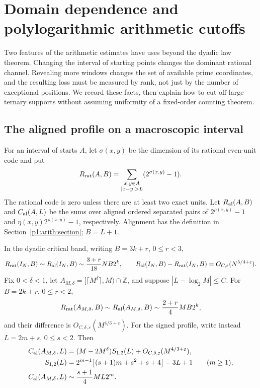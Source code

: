 \section{Domain dependence and polylogarithmic arithmetic cutoffs}
\label{p1:consequences:section}

Two features of the arithmetic estimates have uses beyond the dyadic
law theorem. Changing the interval of starting points changes the dominant
rational channel. Revealing more windows changes the set of available
prime coordinates, and the resulting loss must be measured by rank,
not just by the number of exceptional positions. We record these facts,
then explain how to cut off large ternary supports without assuming
uniformity of a fixed-order counting theorem.

\subsection{The aligned profile on a macroscopic interval}

For an interval of starts $A$, let $\sigma(x,y)$ be the dimension
of its rational even-unit code and put
\[
 R_{\rm rat}(A,B)=\sum_{\substack{x,y\in A\\|x-y|>L}}
             (2^{\sigma(x,y)}-1).
\]
The rational code is zero unless there are at least two exact units.
Let $R_{\rm al}(A,B)$ and $C_{\rm al}(A,L)$ be the sums over
aligned ordered separated pairs of $2^{\rho(x,y)}-1$ and
$\eta(x,y)2^{\rho(x,y)}-1$, respectively. Alignment has the
definition in Section~\ref{p1:arith:section}; $B=L+1$.

\begin{proposition}
\label{p1:consequences:macro}
In the dyadic critical band, writing $B=3k+r$, $0\le r<3$,
\begin{equation}
 R_{\rm rat}(I_N,B)\sim R_{\rm al}(I_N,B)
       \sim \frac{3+r}{18}NB2^k,
 \qquad
 R_{\rm al}(I_N,B)-R_{\rm rat}(I_N,B)
       =O_{C,\varepsilon}(N^{5/4+\varepsilon}).
 \label{p1:consequences:dyadic-positive}
\end{equation}
Fix $0<\delta<1$, let $A_{M,\delta}=[\lceil M^\delta\rceil,M)
\cap\mathbb Z$, and suppose $|L-\log_2M|\le C$.
For $B=2k+r$, $0\le r<2$,
\begin{equation}
 R_{\rm rat}(A_{M,\delta},B)\sim R_{\rm al}(A_{M,\delta},B)
       \sim\frac{2+r}{4}MB2^k,
 \label{p1:consequences:macro-positive}
\end{equation}
and their difference is $O_{C,\delta,\varepsilon}(M^{4/3+\varepsilon})$.
For the signed profile, write instead $L=2m+s$, $0\le s<2$.
Then
\begin{align}
 C_{\rm al}(A_{M,\delta},L)
   &=(M-2M^\delta)S_{1,2}(L)
           +O_{C,\delta,\varepsilon}(M^{4/3+\varepsilon}),
          \label{p1:consequences:macro-signed}\\
 S_{1,2}(L)
   &=2^{m-1}\big[(s+1)m+s^2+s+4\big]-3L+1
       \qquad(m\ge1),\label{p1:consequences:S12}\\
 C_{\rm al}(A_{M,\delta},L)
   &\sim\frac{s+1}{4}ML2^m.
          \label{p1:consequences:macro-equivalent}
\end{align}
\end{proposition}

